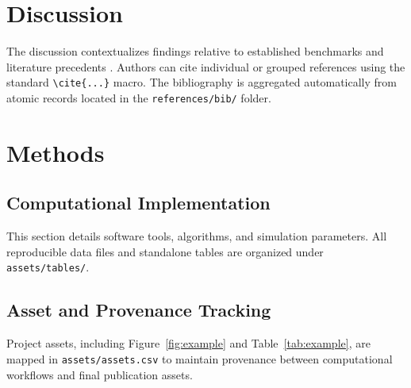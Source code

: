 \documentclass[letterpaper,11pt]{article}
\begin{document}
\section{Discussion}

The discussion contextualizes findings relative to established benchmarks and literature precedents \cite{sample2024, reference2023}. Authors can cite individual or grouped references using the standard \verb|\cite{...}| macro. The bibliography is aggregated automatically from atomic records located in the \texttt{references/bib/} folder.

\section{Methods}

\subsection{Computational Implementation}
This section details software tools, algorithms, and simulation parameters. All reproducible data files and standalone tables are organized under \texttt{assets/tables/}.

\subsection{Asset and Provenance Tracking}
Project assets, including Figure~\ref{fig:example} and Table~\ref{tab:example}, are mapped in \texttt{assets/assets.csv} to maintain provenance between computational workflows and final publication assets.



\end{document}

